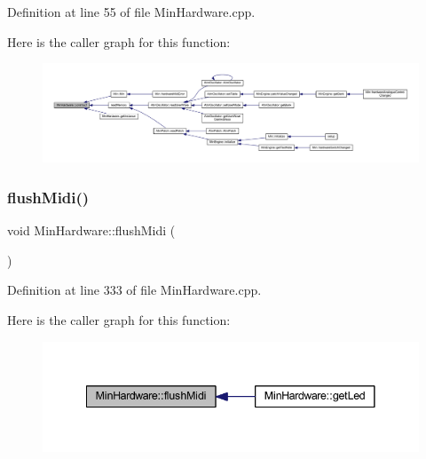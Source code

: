 Definition at line 55 of file Min\+Hardware.\+cpp.

Here is the caller graph for this function\+:
\nopagebreak
\begin{figure}[H]
\begin{center}
\leavevmode
\includegraphics[width=350pt]{class_min_hardware_a39382d7c1fcdcec2858c01c05d4c35aa_icgraph}
\end{center}
\end{figure}
\mbox{\label{class_min_hardware_a21e147f121461594f295852e0a856b64}} 
\subsubsection{\texorpdfstring{flush\+Midi()}{flushMidi()}}
{\footnotesize\ttfamily void Min\+Hardware\+::flush\+Midi (\begin{DoxyParamCaption}{ }\end{DoxyParamCaption})\hspace{0.3cm}{\ttfamily [static]}}



Definition at line 333 of file Min\+Hardware.\+cpp.

Here is the caller graph for this function\+:
\nopagebreak
\begin{figure}[H]
\begin{center}
\leavevmode
\includegraphics[width=341pt]{class_min_hardware_a21e147f121461594f295852e0a856b64_icgraph}
\end{center}
\end{figure}
\mbox{\label{class_min_hardware_a6960d088af0e6dabdd93d943a31906e3}} 

